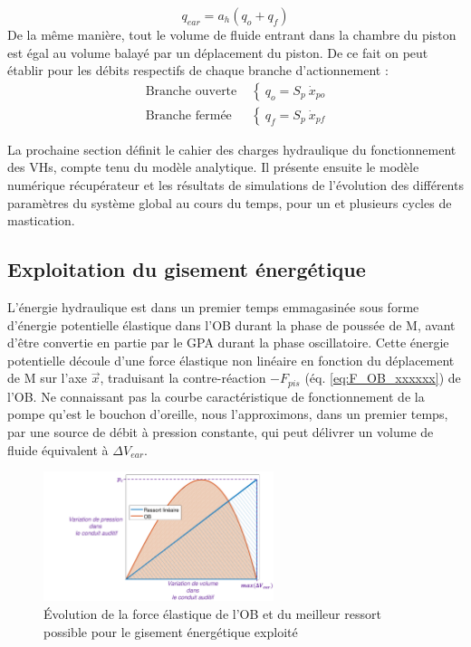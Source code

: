 \begin{equation}
q_{ear} = a_h(q_o + q_f)
\label{eq:conservation_debit_ear}
\end{equation}
De la même manière, tout le volume de fluide entrant dans la chambre du piston est égal au volume balayé par un déplacement du piston. De ce fait on peut établir pour les débits respectifs de chaque branche d'actionnement :
\begin{align}
\text{Branche ouverte~} & \left\{~
q_{o} = S_p\ \dot{x}_{po}
\right.
\label{eq:conservation_debit_piston_ouvert} \\
\text{Branche fermée~}  & \left\{~
q_{f} = S_p\ \dot{x}_{pf}
\right.
\label{eq:conservation_debit_piston_ferme}
\end{align}
	
La prochaine section définit le cahier des charges hydraulique du fonctionnement des VHs, compte tenu du modèle analytique. Il présente ensuite le modèle numérique récupérateur et les résultats de simulations de l'évolution des différents paramètres du système global au cours du temps, pour un et plusieurs cycles de mastication.
		\subsection{Exploitation du gisement énergétique}
		\label{subsubsec:2.4.3:L'exploitation du gisement énergétique}
L'énergie hydraulique est dans un premier temps emmagasinée sous forme d'énergie potentielle élastique dans l'OB durant la phase de poussée de M, avant d'être convertie en partie par le GPA durant la phase oscillatoire. Cette énergie potentielle découle d'une force élastique non linéaire en fonction du déplacement de M sur l'axe $\vec{x}$, traduisant la contre-réaction $-F_{pis}$ (éq. \ref{eq:F_OB_xxxxxx}) de l'OB. Ne connaissant pas la courbe caractéristique de fonctionnement de la pompe qu'est le bouchon d'oreille, nous l'approximons, dans un premier temps, par une source de débit à pression constante, qui peut délivrer un volume de fluide équivalent à $\Delta V_{ear}$.
\begin{figure}[!htbp]
\begin{center}
    \captionsetup{justification=centering}
	\includegraphics[trim={3.7cm 0cm 0cm 0.3cm},clip,width=0.6\textwidth]{../Chap2/Figure/force_elastique_lineaire_vs_OB.pdf}
	\caption{Évolution de la force élastique de l'OB et du meilleur ressort possible pour le gisement énergétique exploité}
	\label{fig:force_elastique_lineaire_vs_OB}
\end{center}	
\end{figure}


